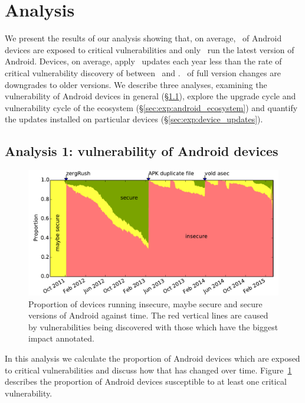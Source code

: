 \documentclass{llncs}
\begin{document}
\section{Analysis}
\label{sec:results}
We present the results of our analysis showing that, on average, \daMeanInsecurityPerc\ of Android devices are exposed to critical vulnerabilities and only \daUpdatednessPerc\ run the latest version of Android.
Devices, on average, apply \daUpdatesPerYear\ updates each year less than the rate of critical vulnerability discovery of between \avoVulnsPerYearAllAndroid\ and \avoVulnsPerYear.
\daPercUpdatesDowngrades\ of full version changes are downgrades to older versions.
We describe three analyses, examining the vulnerability of Android devices in general (\S\ref{sec:exp:versionsecurity}), explore the upgrade cycle and vulnerability cycle of the ecosystem (\S\ref{sec:exp:android_ecosystem}) and quantify the updates installed on particular devices (\S\ref{sec:exp:device_updates}).

\subsection{Analysis 1: vulnerability of Android devices}\label{sec:exp:versionsecurity}
\begin{figure}[h]
\centering
\includegraphics[width=\columnwidth]{figures/proportioninsecure}
\caption{Proportion of devices running insecure, maybe secure and secure versions of Android against time.
The red vertical lines are caused by vulnerabilities being discovered with those which have the biggest impact annotated.
}
\label{fig:proportioninsecure}
\end{figure}
In this analysis we calculate the proportion of Android devices which are exposed to critical vulnerabilities and discuss how that has changed over time.
Figure~\ref{fig:proportioninsecure} describes the proportion of Android devices susceptible to at least one critical vulnerability.
\end{document}
